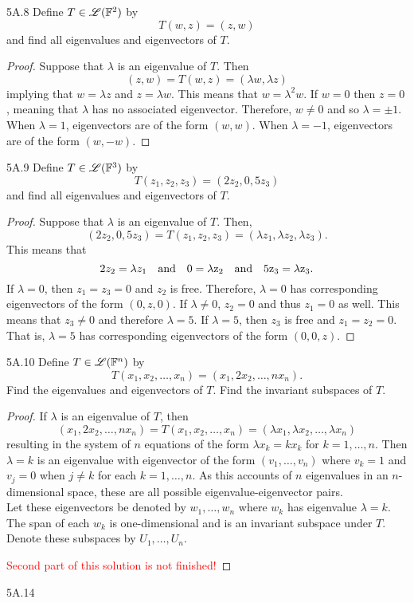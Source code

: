 \documentclass[../AlgebraQualSolutions.tex]{subfiles}
\begin{document}
\begin{LA}{5A.8}{}
Define $T \in\mathscr{L}(\mathbb{F}^2)$ by
	\[T(w,z) = (z,w)\]
and find all eigenvalues and eigenvectors of $T$.
\end{LA}

\begin{proof}
Suppose that $\lambda$ is an eigenvalue of $T$. Then
	\[(z,w) = T(w,z) = (\lambda w, \lambda z) \]
implying that $w = \lambda z$ and $z = \lambda w$. This means that $w = \lambda^2 w$. If $w= 0$ then $z = 0$, meaning that $\lambda$ has no associated eigenvector. Therefore, $w \neq 0$ and so $\lambda = \pm 1$. When $\lambda = 1$, eigenvectors are of the form $(w,w)$. When $\lambda = -1$, eigenvectors are of the form $(w,-w)$.
\end{proof}

\begin{LA}{5A.9}{}
Define $T \in \mathscr{L}(\mathbb{F}^3)$ by
	\[T(z_1, z_2, z_3) = (2z_2, 0, 5z_3) \]
and find all eigenvalues and eigenvectors of $T$.
\end{LA}

\begin{proof}
Suppose that $\lambda$ is an eigenvalue of $T$. Then,
	\[(2z_2, 0, 5z_3) = T(z_1, z_2, z_3) = (\lambda z_1, \lambda z_2, \lambda z_3). \]
This means that
	\[2z_2 = \lambda z_1 \quad \rm{and} \quad 0 = \lambda z_2 \quad \rm{and} \quad 5z_3 = \lambda z_3. \]
If $\lambda = 0$, then $z_1 = z_3 = 0$ and $z_2$ is free. Therefore, $\lambda = 0$ has corresponding eigenvectors of the form $(0, z, 0)$. If $\lambda \neq 0$, $z_2 = 0$ and thus $z_1 = 0$ as well. This means that $z_3 \neq 0$ and therefore $\lambda = 5$. If $\lambda = 5$, then $z_3$ is free and $z_1 = z_2 = 0$. That is, $\lambda = 5$ has corresponding eigenvectors of the form $(0,0,z)$.
\end{proof}

\begin{LA}{5A.10}{}
Define $T \in \mathscr{L}(\mathbb{F}^n)$ by
	\[T(x_1, x_2, \ldots, x_n) = (x_1, 2x_2, \ldots, n x_n). \]
Find the eigenvalues and eigenvectors of $T$. Find the invariant subspaces of $T$.
\end{LA}

\begin{proof}
If $\lambda$ is an eigenvalue of $T$, then
	\[(x_1, 2x_2, \ldots, n x_n) = T(x_1, x_2, \ldots, x_n) = (\lambda x_1, \lambda x_2, \ldots, \lambda x_n) \]
resulting in the system of $n$ equations of the form $\lambda x_k = k x_k$ for $k = 1, \ldots, n$. Then $\lambda = k$ is an eigenvalue with eigenvector of the form $(v_1, \ldots, v_n)$ where $v_k = 1$ and $v_j = 0$ when $j \neq k$ for each $k = 1, \ldots, n$. As this accounts of $n$ eigenvalues in an $n$-dimensional space, these are all possible eigenvalue-eigenvector pairs.\\

Let these eigenvectors be denoted by $w_1, \ldots, w_n$ where $w_k$ has eigenvalue $\lambda = k$. The span of each $w_k$ is one-dimensional and is an invariant subspace under $T$. Denote these subspaces by $U_1, \ldots, U_n$.

\textcolor{red}{Second part of this solution is not finished!}
\end{proof}

\begin{LA}{5A.14}{}
\end{LA}
\end{document}
